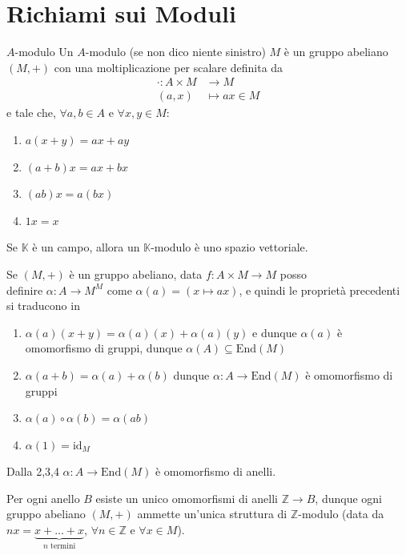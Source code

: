 \section{Richiami sui Moduli}
\begin{definition}{\(A\)-modulo}
    Un \(A\)-modulo (se non dico niente sinistro) \(M\) è un gruppo abeliano
    \({(M, +)}\) con una moltiplicazione per scalare definita da 
    \begin{align*}
        \cdot : A\times M &\longrightarrow M \\
        {(a,x)}&\longmapsto ax \in M
    \end{align*}
    e tale che, \(\forall a,b \in A\) e \(\forall x,y \in M\):
\begin{enumerate}[label = \arabic*)]
    \item \(a{(x+y)} = ax + ay\) 
    \item \({(a+b)}x = ax + bx\) 
    \item \({(ab)}x = a{(bx)}\) 
    \item \(1x = x\) 
\end{enumerate}
\end{definition}
\begin{remark}{}
    Se \(\mathbb{K}\) è un campo, allora un \(\mathbb{K}\)-modulo è uno spazio
    vettoriale.
\end{remark}
\begin{remark}{}
    Se \({(M, +)}\) è un gruppo abeliano, data \(f : A \times  M \to M\) posso
    \\ definire \(\alpha : A \to M^{M}\) come \(\alpha{(a)} = (x \mapsto ax)\),
    e quindi le proprietà precedenti si traducono in 
\begin{enumerate}[label = \arabic*.]
    \item \(\alpha{(a)}{(x+y)} = \alpha{(a)}{(x)} + \alpha{(a)}{(y)}\) e dunque
        \(\alpha{(a)}\) è omomorfismo di gruppi, dunque \(\alpha{(A)} \subseteq \mathrm{End}{(M)}\) 
    \item \(\alpha{(a+b)} = \alpha{(a)}+\alpha{(b)}\) dunque \(\alpha : A \to \mathrm{End}{(M)}\) è omomorfismo di gruppi
    \item \(\alpha{(a)}\circ \alpha{(b)} = \alpha{(ab)}\) 
    \item \(\alpha{(1)} = \mathrm{id}_M\) 
\end{enumerate}
Dalla 2,3,4 \(\alpha : A \to \mathrm{End}{(M)}\) è omomorfismo di anelli.
\end{remark}

\begin{remark}{}
    Per ogni anello \(B\) esiste un unico omomorfismi di anelli \(\mathbb{Z} \to
    B\), dunque ogni gruppo abeliano \({(M, +)}\) ammette un'unica struttura di
    \(\mathbb{Z}\)-modulo (data da \(nx = \underbrace{x + \dots + x}_{n
    \text{ termini}}\),
    \(\forall n \in \mathbb{Z}\) e \(\forall x \in M\)).
\end{remark}

